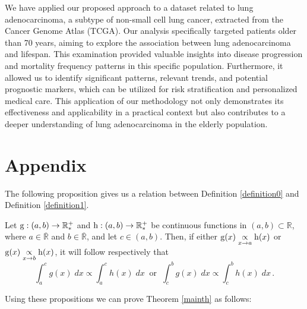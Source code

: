 We have applied our proposed approach to a dataset related to lung adenocarcinoma, a subtype of non-small cell lung cancer, extracted from the Cancer Genome Atlas (TCGA). Our analysis specifically targeted patients older than 70 years, aiming to explore the association between lung adenocarcinoma and lifespan. This examination provided valuable insights into disease progression and mortality frequency patterns in this specific population. Furthermore, it allowed us to identify significant patterns, relevant trends, and potential prognostic markers, which can be utilized for risk stratification and personalized medical care. This application of our methodology not only demonstrates its effectiveness and applicability in a practical context but also contributes to a deeper understanding of lung adenocarcinoma in the elderly population.


\section*{Appendix}

The following proposition gives us a relation between Definition \ref{definition0} and Definition \ref{definition1}.

\begin{proposition}\label{proportional2} Let $\operatorname{g}:(a,b)\to\mathbb{R^+_*}$ and $\operatorname{h}:(a,b)\to\mathbb{R^+_*}$ be continuous functions in $(a,b)\subset\mathbb{R}$, where $a\in\overline{\mathbb{R}}$ and $b\in\overline{\mathbb{R}}$, and let $c\in(a,b)$. Then, if either $\operatorname{g}(x)\underset{x\to a}{\propto} \operatorname{h}(x)$ or $\operatorname{g}(x)\underset{x\to b}{\propto} \operatorname{h}(x)$, it will follow respectively that
\begin{equation*}
\int_a^c g(x)\; dx \propto \int_a^c h(x)\; dx\ \mbox{ or }\ \int_c^b g(x)\; dx \propto \int_c^b h(x)\; dx \,.
\end{equation*}
\end{proposition} 

Using these propositions we can prove Theorem \ref{mainth} as follows:

